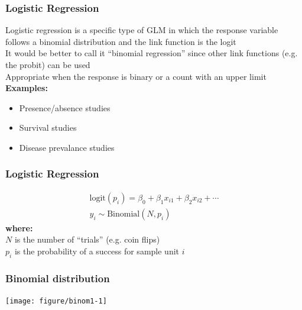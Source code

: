 \documentclass[color=usenames,dvipsnames]{beamer}\usepackage[]{graphicx}\usepackage[]{color}
\newenvironment{knitrout}{}{} %
\begin{document}
\begin{frame}
  \frametitle{Logistic Regression}
  Logistic regression is a specific type of GLM in which the
      response variable follows a binomial distribution and the link
      function is the logit \\
  \pause
  \vfill
  It would be better to call it ``binomial regression'' since other
      link functions (e.g. the probit) can be used \\
  \pause
  \vfill
  Appropriate when the response is binary or a count with an
  upper limit
  \pause
  \vfill
  {\bf Examples:}
      \begin{itemize}
        \normalsize
        \item Presence/absence studies
        \item Survival studies
        \item Disease prevalance studies
      \end{itemize}
\end{frame}







\begin{frame}
  \frametitle{Logistic Regression}
    \begin{gather*}
      \mathrm{logit}(p_i) = \beta_0 + \beta_1 x_{i1} + \beta_2 x_{i2} + \cdots \\
      y_i \sim \mathrm{Binomial}(N, p_i)
  \end{gather*}
  \pause
  {\bf where: \\}
  $N$ is the number of ``trials'' (e.g. coin flips) \\
  $p_i$ is the probability of a success for sample unit $i$
\end{frame}



\begin{frame}[fragile]
  \frametitle{Binomial distribution}%
  \vspace{-0.4cm}
\begin{center}
\begin{knitrout}
\color{fgcolor}
\texttt{[image: figure/binom1-1]} 

\end{knitrout}
\end{center}
\vfill
\end{frame}
\end{document}
